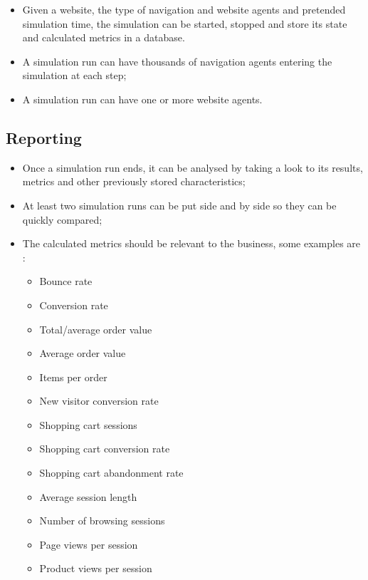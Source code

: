 \begin{itemize}
    \item Given a website, the type of navigation and website agents and 
    pretended simulation time, the simulation can be started, stopped and store 
    its state and calculated metrics in a database.
    \item A simulation run can have thousands of navigation agents entering the 
    simulation at each step;
    \item A simulation run can have one or more website agents.
\end{itemize}

\subsection{Reporting}

\begin{itemize}
    \item Once a simulation run ends, it can be analysed by taking a look to 
    its results, metrics and other previously stored characteristics;
    \item At least two simulation runs can be put side and by side so they can 
    be quickly compared;
    \item The calculated metrics should be relevant to the business, some 
    examples are \cite{Watson2015}:
    \begin{itemize}
        \item Bounce rate
        \item Conversion rate
        \item Total/average order value
        \item Average order value
        \item Items per order
        \item New visitor conversion rate
        \item Shopping cart sessions
        \item Shopping cart conversion rate
        \item Shopping cart abandonment rate
        \item Average session length
        \item Number of browsing sessions
        \item Page views per session
        \item Product views per session
    \end{itemize}
\end{itemize}

